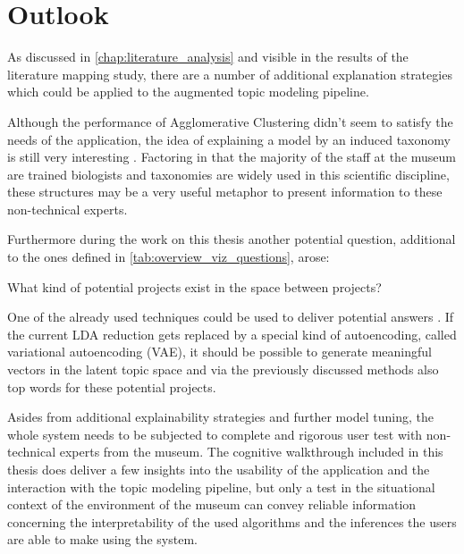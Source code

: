 \section{Outlook}   
As discussed in \autoref{chap:literature_analysis} and visible in the results of the literature mapping study, there are a number of additional explanation strategies which could be applied to the augmented topic modeling pipeline.

Although the performance of Agglomerative Clustering didn't seem to satisfy the needs of the application, the idea of explaining a model by an induced taxonomy is still very interesting \cite{Liu:2018:INE:3219819.3220001}. Factoring in that the majority of the staff at the museum are trained biologists and taxonomies are widely used in this scientific discipline, these structures may be a very useful metaphor to present information to these non-technical experts.

Furthermore during the work on this thesis another potential question, additional to the ones defined in \autoref{tab:overview_viz_questions}, arose:
\begin{center}
	What kind of potential projects exist in the space between projects?
\end{center}
One of the already used techniques could be used to deliver potential answers . If the current LDA reduction gets replaced by a special kind of autoencoding, called variational autoencoding (VAE), it should be possible to generate meaningful vectors in the latent topic space and via the previously discussed methods also top words for these potential projects. 

Asides from additional explainability strategies and further model tuning, the whole system needs to be subjected to complete and rigorous user test with non-technical experts from the museum. The cognitive walkthrough included in this thesis does deliver a few insights into the usability of the application and the interaction with the topic modeling pipeline, but only a test in the situational context of the environment of the museum can convey reliable information concerning the interpretability of the used algorithms and the inferences the users are able to make using the system.
